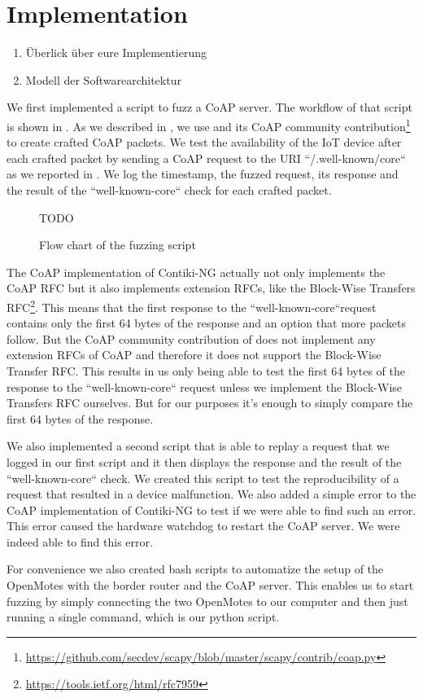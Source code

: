 \section{Implementation}
\label{section:implementation}

\begin{enumerate}
	\item Überlick über eure Implementierung
	\item Modell der Softwarearchitektur
\end{enumerate}

We first implemented a script to fuzz a CoAP server. The workflow of that script is shown in . As we described in , we use \scapy and its CoAP community contribution\footnote{\url{https://github.com/secdev/scapy/blob/master/scapy/contrib/coap.py}} to create crafted CoAP packets. We test the availability of the IoT device after each crafted packet by sending a CoAP request to the URI ``/.well-known/core`` as we reported in . We log the timestamp, the fuzzed request, its response and the result of the ``well-known-core`` check for each crafted packet.

\begin{figure}[h]
		\centering
		TODO
		\caption{Flow chart of the fuzzing script}
		\label{figure:fuzz_flow_chart}
\end{figure}

The CoAP implementation of Contiki-NG actually not only implements the CoAP RFC but it also implements extension RFCs, like the Block-Wise Transfers RFC\footnote{\url{https://tools.ietf.org/html/rfc7959}}. This means that the first response to the ``well-known-core``request contains only the first 64 bytes of the response and an option that more packets follow. But the CoAP community contribution of \scapy does not implement any extension RFCs of CoAP and therefore it does not support the Block-Wise Transfer RFC. This results in us only being able to test the first 64 bytes of the response to the ``well-known-core`` request unless we implement the Block-Wise Transfers RFC ourselves. But for our purposes it's enough to simply compare the first 64 bytes of the response.

We also implemented a second script that is able to replay a request that we logged in our first script and it then displays the response and the result of the ``well-known-core`` check. We created this script to test the reproducibility of a request that resulted in a device malfunction. We also added a simple error to the CoAP implementation of Contiki-NG to test if we were able to find such an error. This error caused the hardware watchdog to restart the CoAP server. We were indeed able to find this error.

For convenience we also created bash scripts to automatize the setup of the OpenMotes with the border router and the CoAP server. This enables us to start fuzzing by simply connecting the two OpenMotes to our computer and then just running a single command, which is our python script.
